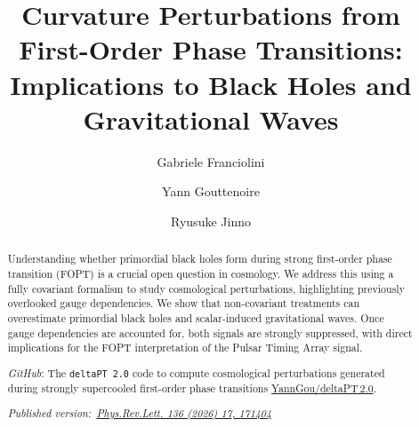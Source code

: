 \documentclass[twocolumn,superscriptaddress,aps,preprintnumbers,amsmath,amssymb,prl,footinbib]{revtex4-2}
\begin{document}
\title{Curvature Perturbations from First-Order Phase Transitions:
\texorpdfstring{\\}{}Implications to Black Holes and Gravitational Waves}

\author{Gabriele Franciolini}
\author{Yann Gouttenoire}
\author{Ryusuke Jinno}

\begin{abstract}





{Understanding whether primordial black holes form during strong first-order phase transition (FOPT) is a crucial open question in cosmology.} We address this using a fully covariant formalism to study cosmological perturbations, highlighting previously overlooked gauge dependencies. We show that non-covariant treatments can overestimate primordial black holes and scalar-induced gravitational waves. Once gauge dependencies are accounted for, both signals are strongly suppressed, {with direct implications for the FOPT interpretation of the Pulsar Timing Array signal.}


\vspace*{5pt} \noindent \textit{GitHub}: The {\tt deltaPT\,2.0} code to compute cosmological perturbations generated during strongly supercooled first-order phase transitions \href{https://github.com/YannGou/deltaPT2.0}{\faGithub\;YannGou/deltaPT\,2.0}.

\vspace*{5pt}
\noindent
\textit{Published version:~\href{https://doi.org/10.1103/tfcx-kzqx}{Phys.Rev.Lett. 136 (2026) 17, 171404}}
\end{abstract}




\maketitle
\end{document}
